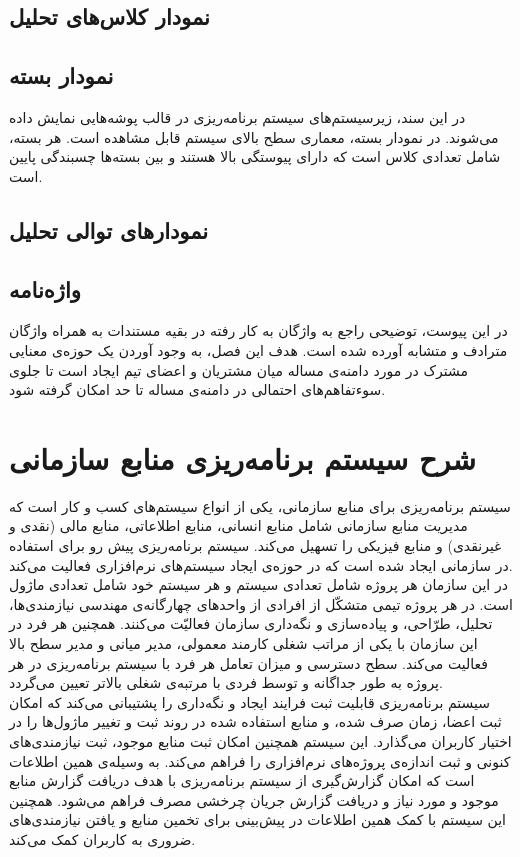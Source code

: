 \subsection{نمودار کلاس‌های تحلیل}


\subsection{نمودار بسته}
در این سند، زیرسیستم‌های سیستم برنامه‌ریزی در قالب پوشه‌هایی نمایش داده می‌شوند. در نمودار بسته، معماری سطح بالای سیستم قابل مشاهده است. هر بسته، شامل تعدادی کلاس است که دارای پیوستگی
بالا هستند و بین بسته‌ها چسبندگی
پایین است.

\subsection{نمودارهای توالی تحلیل}


\subsection{واژه‌نامه}
در این پیوست، توضیحی راجع به واژگان به کار رفته در بقیه مستندات به همراه واژگان مترادف و متشابه آورده شده است. هدف این فصل، به وجود آوردن یک حوزه‌ی معنایی مشترک در مورد دامنه‌ی مساله میان مشتریان و اعضای تیم ایجاد است  تا جلوی سوء‌تفاهم‌های احتمالی در دامنه‌ی مساله تا حد امکان گرفته شود.


\newpage
\section{شرح سیستم برنامه‌ریزی منابع سازمانی}
سیستم برنامه‌ریزی برای منابع سازمانی، یکی از انواع سیستم‌های کسب و کار است که مدیریت منابع سازمانی شامل منابع انسانی، منابع اطلاعاتی، منابع مالی (نقدی و غیرنقدی) و منابع فیزیکی را تسهیل می‌کند. سیستم برنامه‌ریزی پیش رو برای استفاده در سازمانی ایجاد شده است که در حوزه‌ی ایجاد سیستم‌های نرم‌افزاری فعالیت می‌کند. \\
در این سازمان هر پروژه شامل تعدادی سیستم و هر سیستم خود شامل تعدادی ماژول است. در هر پروژه تیمی متشکّل از افرادی از واحدهای چهارگانه‌ی مهندسی نیازمندی‌ها، تحلیل، طرّاحی، و پیاده‌سازی و نگه‌داری سازمان فعالیّت می‌کنند. همچنین هر فرد در این سازمان با یکی از مراتب شغلی کارمند معمولی، مدیر میانی و مدیر سطح بالا فعالیت می‌کند. سطح دسترسی و میزان تعامل هر فرد با سیستم برنامه‌ریزی در هر پروژه به طور جداگانه و توسط فردی با مرتبه‌ی شغلی بالاتر تعیین می‌گردد. \\
سیستم برنامه‌ریزی قابلیت ثبت فرایند ایجاد و نگه‌داری را پشتیبانی می‌کند که امکان ثبت اعضا، زمان صرف شده، و منابع استفاده شده در روند ثبت و تغییر ماژول‌ها را در اختیار کاربران می‌گذارد. این سیستم همچنین امکان ثبت منابع موجود، ثبت نیازمندی‌های کنونی و ثبت اندازه‌ی پروژه‌های نرم‌افزاری را فراهم می‌کند. به وسیله‌ی همین اطلاعات است که امکان گزارش‌گیری از سیستم برنامه‌ریزی با هدف دریافت گزارش منابع موجود و مورد نیاز و دریافت گزارش جریان چرخشی مصرف فراهم می‌شود. همچنین این سیستم با کمک همین اطلاعات در پیش‌بینی برای تخمین منابع و یافتن نیازمندی‌های ضروری به کاربران کمک می‌کند. \\

